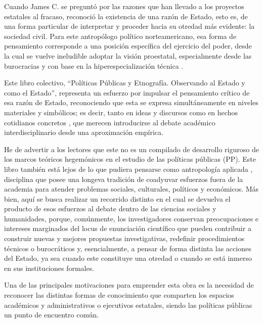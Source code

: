 \documentclass[
  spanish,
  11pt,
  a4paper,
]{scrbook}
\begin{document}
Cuando James C. \textcite{Scott1998} se preguntó por las razones que han
llevado a los proyectos estatales al fracaso, reconoció la existencia de
una razón de Estado, esto es, de una forma particular de interpretar y
proceder hacia su otredad más evidente: la sociedad civil. Para este
antropólogo político norteamericano, esa forma de pensamiento
corresponde a una posición específica del ejercicio del poder, desde la
cual se vuelve ineludible adoptar la visión proestatal, especialmente
desde las burocracias \autocite{Graeber2019} y con base en la
hiperespecialización técnica \autocite{Mitchell2002}.

Este libro colectivo, ``Políticas Públicas y Etnografía. Observando al
Estado y como el Estado'', representa un esfuerzo por impulsar el
pensamiento crítico de esa razón de Estado, reconociendo que esta se
expresa simultáneamente en niveles materiales y simbólicos; es decir,
tanto en ideas y discursos como en hechos cotidianos concretos
\autocite{Abrams1977}, que merecen introducirse al debate académico
interdisciplinario desde una aproximación empírica.

He de advertir a los lectores que este no es un compilado de desarrollo
riguroso de los marcos teóricos hegemónicos en el estudio de las
políticas públicas (PP). Este libro también está lejos de lo que pudiera
pensarse como antropología aplicada \autocite{Garrison1895}, disciplina
que posee una longeva tradición de coadyuvar esfuerzos fuera de la
academia para atender problemas sociales, culturales, políticos y
económicos. Más bien, aquí se busca realizar un recorrido distinto en el
cual se devuelva el producto de esos esfuerzos al debate dentro de las
ciencias sociales y humanidades, porque, comúnmente, los investigadores
conservan preocupaciones e intereses marginados del locus de enunciación
científico que pueden contribuir a construir nuevas y mejores propuestas
investigativas, redefinir procedimientos técnicos o burocráticos y,
esencialmente, a pensar de forma distinta las acciones del Estado, ya
sea cuando este constituye una otredad o cuando se está inmerso en sus
instituciones formales.

Una de las principales motivaciones para emprender esta obra es la
necesidad de reconocer las distintas formas de conocimiento que
comparten los espacios académicos y administrativos o ejecutivos
estatales, siendo las políticas públicas un punto de encuentro común.
\end{document}
